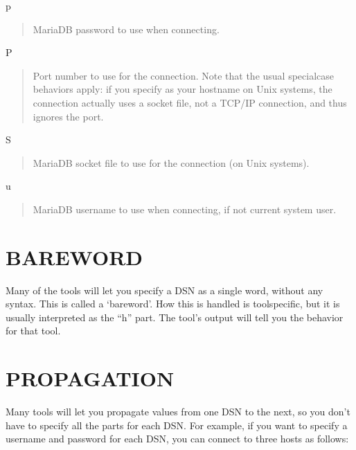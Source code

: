 \documentclass[letterpaper,10pt,english]{sphinxmanual}
\begin{document}
p
\begin{quote}

MariaDB password to use when connecting.
\end{quote}

P
\begin{quote}

Port number to use for the connection.  Note that the usual special\sphinxhyphen{}case
behaviors apply: if you specify  as your hostname on Unix systems,
the connection actually uses a socket file, not a TCP/IP connection, and thus
ignores the port.
\end{quote}

S
\begin{quote}

MariaDB socket file to use for the connection (on Unix systems).
\end{quote}

u
\begin{quote}

MariaDB username to use when connecting, if not current system user.
\end{quote}


\section{BAREWORD}
\label{\detokenize{dsn_data_source_name_specifications:bareword}}
Many of the tools will let you specify a DSN as a single word, without any
 syntax.  This is called a ‘bareword’.  How this is handled is
tool\sphinxhyphen{}specific, but it is usually interpreted as the “h” part.  The tool’s
 output will tell you the behavior for that tool.


\section{PROPAGATION}
\label{\detokenize{dsn_data_source_name_specifications:propagation}}
Many tools will let you propagate values from one DSN to the next, so you don’t
have to specify all the parts for each DSN.  For example, if you want to specify
a username and password for each DSN, you can connect to three hosts as follows:

\begin{sphinxVerbatim}[commandchars=\\\{\}]
  
\end{sphinxVerbatim}
\end{document}
